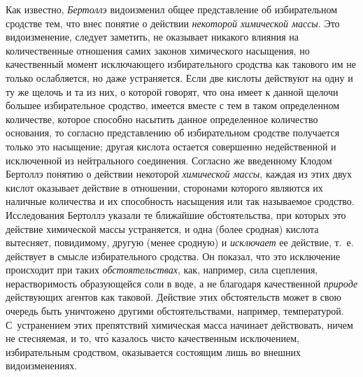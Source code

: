 Как известно, {\em Бертоллэ} видоизменил общее представление об избирательном
сродстве тем, что внес понятие о действии {\em некоторой химической массы}. Это
видоизменение, следует заметить, не оказывает никакого влияния на
количественные отношения самих законов химического насыщения, но качественный
момент исключающего избирательного сродства как такового им не только
ослабляется, но даже устраняется. Если две кислоты действуют на одну и ту же
щелочь и та из них, о которой говорят, что она имеет к данной щелочи большее
избирательное сродство, имеется вместе с тем в таком определенном количестве,
которое способно насытить данное определенное количество основания, то согласно
представлению об избирательном сродстве получается только это насыщение; другая кислота
остается совершенно недейственной и исключенной из нейтрального соединения.
Согласно же введенному Клодом Бертоллэ понятию о действии некоторой
{\em химической массы}, каждая из этих двух кислот оказывает действие в
отношении, сторонами которого являются их наличные количества и их способность
насыщения или так называемое сродство. Исследования Бертоллэ указали те
ближайшие обстоятельства, при которых это действие химической массы
устраняется, и одна (более сродная) кислота вытесняет, повидимому, другую
(менее сродную) и {\em исключает} ее действие, т.~е. действует в смысле
избирательного сродства. Он показал, что это исключение происходит при таких
{\em обстоятельствах}, как, например, сила сцепления, нерастворимость
образующейся соли в воде, а не благодаря качественной {\em природе} действующих
агентов как таковой. Действие этих обстоятельств может в свою очередь быть
уничтожено другими обстоятельствами, например, температурой. С~устранением этих
препятствий химическая масса начинает действовать, ничем не стесняемая, и то,
чт\'{о} казалось чисто качественным исключением, избирательным сродством,
оказывается состоящим лишь во внешних видоизменениях.

